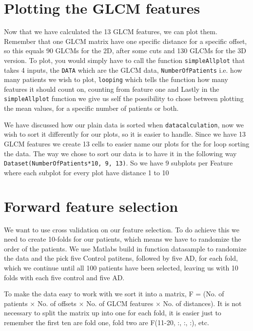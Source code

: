 \section{Plotting the GLCM features}
Now that we have calculated the 13 GLCM features, we can plot them. Remember that one GLCM matrix have one specific distance for a specific offset, so this equals 90 GLCMs for the 2D, after some cuts and 130 GLCMs for the 3D version. To plot, you would simply have to call the function \texttt{simpleAllplot} that takes 4 inputs, the \texttt{DATA} which are the GLCM data, \texttt{NumberOfPatients} i.e. how many patients we wish to plot, \texttt{looping} which tells the function how many features it should count on, counting from feature one and Lastly in the \texttt{simpleAllplot} function we give us self the possibility to chose between plotting the mean values, for a specific number of patients or both.

We have discussed how our plain data is sorted when \texttt{datacalculation}, now we wish to sort it differently for our plots, so it is easier to handle. Since we have 13 GLCM features  we create 13 cells to easier name our plots for the for loop sorting the data. The way we chose to sort our data is to have it in the following way \texttt{Dataset(NumberOfPatients*10, 9, 13)}. So we have 9 subplots per Feature where each subplot for every plot have distance 1 to 10 


\section{Forward feature selection}

We want to use cross validation on our feature selection. To do achieve this we need to create 10-folds for our patients, which means we have to randomize the order of the patients. We use Matlabs build in function datasample to randomize the data and the pick five Control patitens, followed by five AD, for each fold, which we continue until all 100 patients have been selected, leaving us with 10 folds with each five control and five AD.

To make the data easy to work with we sort it into a matrix, F = (No. of patients $\times$ No. of offsets $\times$ No. of GLCM features $\times$ No. of distances). It is not necessary to split the matrix up into one for each fold, it is easier just to remember the first ten are fold one, fold two are F(11-20, :, :, :), etc.

